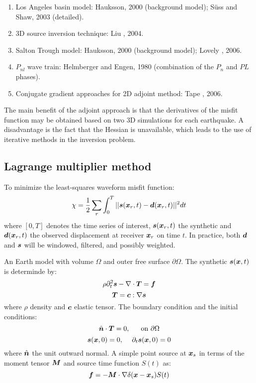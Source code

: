 \begin{enumerate}[\hspace{10mm}*]
  \item Los Angeles basin model: Hauksson, 2000 (background model);
    S\"{u}ss and Shaw, 2003 (detailed).
  \item 3D source inversion technique: Liu \etal, 2004.
  \item Salton Trough model: Hauksson, 2000 (background model); Lovely \etal, 2006.
  \item $P_{nl}$ wave train: Helmberger and Engen, 1980 (combination of the $P_n$ and $PL$ phases).
  \item Conjugate gradient approaches for 2D adjoint method: Tape \etal, 2006.
\end{enumerate}

The main benefit of the adjoint approach is that the \Frechet derivatives of the misfit function
may be obtained based on two 3D simulations for each earthquake.
A disadvantage is the fact that the Hessian is unavailable,
which leads to the use of iterative methods in the inversion problem.

\subsection{Lagrange multiplier method}
To minimize the least-squares waveform misfit function:
\[ \chi=\frac{1}{2}\sum_r\int_0^T||\boldsymbol{s}(\boldsymbol{x}_r,t)-\boldsymbol{d}(\boldsymbol{x}_r,t)||^2dt \]
where $[0,T]$ denotes the time series of interest, $\boldsymbol{s}(\boldsymbol{x}_r,t)$ the synthetic
and $\boldsymbol{d}(\boldsymbol{x}_r,t)$ the observed displacement at receiver $\boldsymbol{x}_r$ on time $t$.
In practice, both $\boldsymbol{d}$ and $\boldsymbol{s}$ will be windowed, filtered, and possibly weighted.

An Earth model with volume $\Omega$ and outer free surface $\partial\Omega$.
The synthetic $\boldsymbol{s}(\boldsymbol{x},t)$ is determinde by:
\[ \rho\partial_t^2\boldsymbol{s}-\nabla\cdot\boldsymbol{T}=\boldsymbol{f} \]
\[ \boldsymbol{T}=\boldsymbol{c}:\nabla\boldsymbol{s} \]
where $\rho$ density and $\boldsymbol{c}$ elastic tensor.
The boundary condition and the initial conditions:
\[ \hat{\boldsymbol{n}}\cdot\boldsymbol{T}=0 \text{,\hspace{5mm} on } \partial\Omega \]
\[ \boldsymbol{s}(\boldsymbol{x},0)=0 \text{,\hspace{5mm}} \partial_t\boldsymbol{s}(\boldsymbol{x},0)=0 \]
where $\hat{\boldsymbol{n}}$ the unit outward normal.
A simple point source at $\boldsymbol{x}_s$ in terms of the moment tensor $\boldsymbol{M}$
and source time function $S(t)$ as:
\[ \boldsymbol{f}=-\boldsymbol{M}\cdot\nabla\delta(\boldsymbol{x}-\boldsymbol{x}_s)S(t) \]

